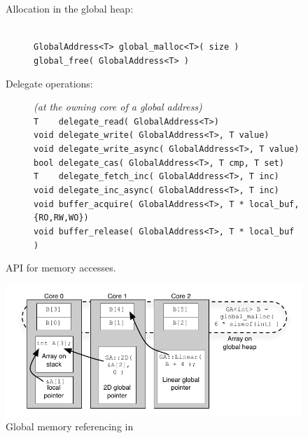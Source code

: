 \begin{figure}[htbp]
  \begin{center}
    \begin{minipage}{0.95\columnwidth}
	\small
  \begin{description}
    \item[Allocation in the global heap:] \hfill \\
      	\lstinline[style=grappa]{GlobalAddress<T> global_malloc<T>( size )} \hfill \\
      	\lstinline[style=grappa]{global_free( GlobalAddress<T> )}  \hfill
    \item[Delegate operations:] \emph{(at the owning core of a global address)} \hfill \\
      	\lstinline|T    delegate_read( GlobalAddress<T>)|  \hfill \\
      	\lstinline|void delegate_write( GlobalAddress<T>, T value)| \hfill \\
      	\lstinline|void delegate_write_async( GlobalAddress<T>, T value)| \hfill \\
      	\lstinline|bool delegate_cas( GlobalAddress<T>, T cmp, T set)| \hfill \\
      	\lstinline|T    delegate_fetch_inc( GlobalAddress<T>, T inc)| \hfill \\
      	\lstinline|void delegate_inc_async( GlobalAddress<T>, T inc)|  \hfill\\ 
        \lstinline|void buffer_acquire( GlobalAddress<T>, T * local_buf, {RO,RW,WO})| \hfill \\
        \lstinline|void buffer_release( GlobalAddress<T>, T * local_buf )| \hfill
	\end{description}
      \caption{\label{fig:accessing-memory} \Grappa API for memory accesses.}     \end{minipage}
  \end{center}
\end{figure}

\begin{figure}[t]
\begin{center}
  \includegraphics[width=0.95\columnwidth]{figs/memory-structure}
\begin{minipage}{0.95\columnwidth}
  \caption{\label{fig:memory-structure} Global memory referencing in \Grappa}
\end{minipage}
\vspace{-3ex}
\end{center}
\end{figure}


